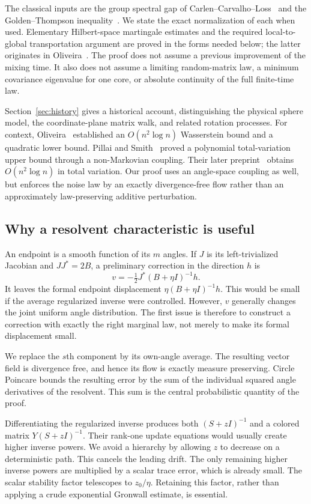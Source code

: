 \documentclass[11pt]{article}
\theoremstyle{definition}\newtheorem{definition}[theorem]{Definition}
\theoremstyle{remark}\newtheorem{remark}[theorem]{Remark}
\begin{document}
The classical inputs are the group spectral gap of Carlen--Carvalho--Loss~\cite{CCL} and the Golden--Thompson inequality~\cite{Golden,Thompson}. We state the exact normalization of each when used. Elementary Hilbert-space martingale estimates and the required local-to-global transportation argument are proved in the forms needed below; the latter originates in Oliveira~\cite{Oliveira}. The proof does not assume a previous improvement of the mixing time. It also does not assume a limiting random-matrix law, a minimum covariance eigenvalue for one core, or absolute continuity of the full finite-time law.

Section~\ref{sec:history} gives a historical account, distinguishing the physical sphere model, the coordinate-plane matrix walk, and related rotation processes. For context, Oliveira~\cite{Oliveira} established an $O(n^2\log n)$ Wasserstein bound and a quadratic lower bound. Pillai and Smith~\cite{PS18} proved a polynomial total-variation upper bound through a non-Markovian coupling. Their later preprint~\cite{PS26} obtains $O(n^2\log n)$ in total variation. Our proof uses an angle-space coupling as well, but enforces the noise law by an exactly divergence-free flow rather than an approximately law-preserving additive perturbation.

\subsection{Why a resolvent characteristic is useful}
An endpoint is a smooth function of its $m$ angles. If $J$ is its left-trivialized Jacobian and $JJ^*=2B$, a preliminary correction in the direction $h$ is
\[
 v=-\tfrac12J^*(B+\eta I)^{-1}h.
\]
It leaves the formal endpoint displacement $\eta(B+\eta I)^{-1}h$. This would be small if the average regularized inverse were controlled. However, $v$ generally changes the joint uniform angle distribution. The first issue is therefore to construct a correction with exactly the right marginal law, not merely to make its formal displacement small.

We replace the $s$th component by its own-angle average. The resulting vector field is divergence free, and hence its flow is exactly measure preserving. Circle Poincare bounds the resulting error by the sum of the individual squared angle derivatives of the resolvent. This sum is the central probabilistic quantity of the proof.

Differentiating the regularized inverse produces both $(S+zI)^{-1}$ and a colored matrix $Y(S+zI)^{-1}$. Their rank-one update equations would usually create higher inverse powers. We avoid a hierarchy by allowing $z$ to decrease on a deterministic path. This cancels the leading drift. The only remaining higher inverse powers are multiplied by a scalar trace error, which is already small. The scalar stability factor telescopes to $z_0/\eta$. Retaining this factor, rather than applying a crude exponential Gronwall estimate, is essential.
\end{document}
